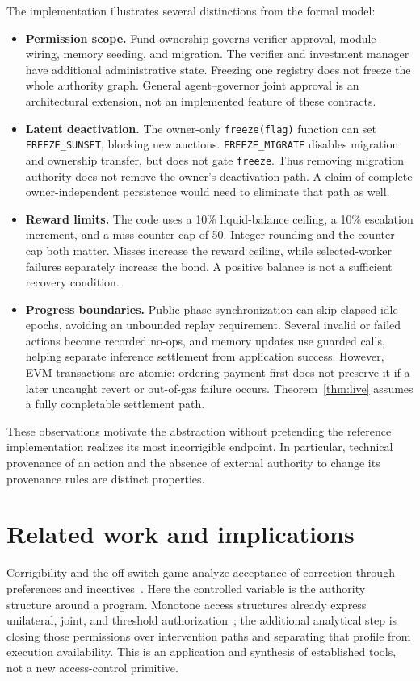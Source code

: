 \documentclass[10pt,letterpaper]{article}
\begin{document}
The implementation illustrates several distinctions from the formal model:
\begin{itemize}
\item \textbf{Permission scope.} Fund ownership governs verifier approval, module wiring, memory seeding, and migration. The verifier and investment manager have additional administrative state. Freezing one registry does not freeze the whole authority graph. General agent--governor joint approval is an architectural extension, not an implemented feature of these contracts.
\item \textbf{Latent deactivation.} The owner-only \texttt{freeze(flag)} function can set \texttt{FREEZE\_SUNSET}, blocking new auctions. \texttt{FREEZE\_MIGRATE} disables migration and ownership transfer, but does not gate \texttt{freeze}. Thus removing migration authority does not remove the owner's deactivation path. A claim of complete owner-independent persistence would need to eliminate that path as well.
\item \textbf{Reward limits.} The code uses a 10\% liquid-balance ceiling, a 10\% escalation increment, and a miss-counter cap of 50. Integer rounding and the counter cap both matter. Misses increase the reward ceiling, while selected-worker failures separately increase the bond. A positive balance is not a sufficient recovery condition.
\item \textbf{Progress boundaries.} Public phase synchronization can skip elapsed idle epochs, avoiding an unbounded replay requirement. Several invalid or failed actions become recorded no-ops, and memory updates use guarded calls, helping separate inference settlement from application success. However, EVM transactions are atomic: ordering payment first does not preserve it if a later uncaught revert or out-of-gas failure occurs. Theorem~\ref{thm:live} assumes a fully completable settlement path.
\end{itemize}
These observations motivate the abstraction without pretending the reference implementation realizes its most incorrigible endpoint. In particular, technical provenance of an action and the absence of external authority to change its provenance rules are distinct properties.

\section{Related work and implications}
Corrigibility and the off-switch game analyze acceptance of correction through preferences and incentives~\citep{soares2015,offswitch2017}. Here the controlled variable is the authority structure around a program. Monotone access structures already express unilateral, joint, and threshold authorization~\citep{benaloh1990}; the additional analytical step is closing those permissions over intervention paths and separating that profile from execution availability. This is an application and synthesis of established tools, not a new access-control primitive.
\end{document}
